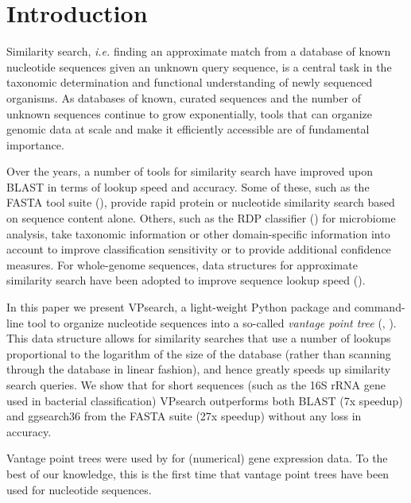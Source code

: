 \documentclass{bioinfo}
\begin{document}
\section{Introduction}

Similarity search, \emph{i.e.} finding an approximate match from a database of
known nucleotide sequences given an unknown query sequence, is a central task
in the taxonomic determination and functional understanding of newly sequenced
organisms. As databases of known, curated sequences and the number of unknown
sequences continue to grow exponentially, tools that can organize genomic data
at scale and make it efficiently accessible are of fundamental importance.

Over the years, a number of tools for similarity search have improved upon
BLAST in terms of lookup speed and accuracy. Some of these, such as the FASTA
tool suite (\cite{2016-pearson-FindingProteinNucleotide}), provide rapid
protein or nucleotide similarity search based on sequence content
alone. Others, such as the RDP classifier
(\cite{2007-wang-NaiveBayesianClassifier}) for microbiome analysis, take
taxonomic information or other domain-specific information into account to
improve classification sensitivity or to provide additional confidence
measures. For whole-genome sequences, data structures for approximate
similarity search have been adopted to improve sequence lookup speed
(\cite{2019-marcais-SketchingSublinearData}).

In this paper we present VPsearch, a light-weight Python package and
command-line tool to organize nucleotide sequences into a so-called
\emph{vantage point tree} (\cite{1991-uhlmann-SatisfyingGeneralProximity},
\cite{1993-yianilos-DataStructuresAlgorithms}). This data structure allows for
similarity searches that use a number of lookups proportional to the logarithm
of the size of the database (rather than scanning through the database in
linear fashion), and hence greatly speeds up similarity search queries. We show
that for short sequences (such as the 16S rRNA gene used in bacterial
classification) VPsearch outperforms both BLAST (7x speedup) and ggsearch36
from the FASTA suite (27x speedup) without any loss in accuracy.

Vantage point trees were used by
\cite{2016-defreitas-GEMINIComputationallyefficientSearch} for (numerical) gene
expression data. To the best of our knowledge, this is the first time that
vantage point trees have been used for nucleotide sequences.

\vspace*{-0.5cm}
\end{document}
